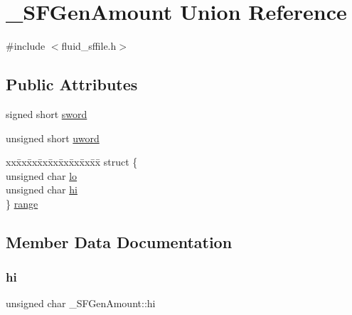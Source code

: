 \hypertarget{union__SFGenAmount}{}\section{\+\_\+\+S\+F\+Gen\+Amount Union Reference}
\label{union__SFGenAmount}


{\ttfamily \#include $<$fluid\+\_\+sffile.\+h$>$}

\subsection*{Public Attributes}
\begin{DoxyCompactItemize}
\item 
signed short \hyperlink{union__SFGenAmount_a0ec8e03ee604c20f645b9c13b6372ffe}{sword}
\item 
unsigned short \hyperlink{union__SFGenAmount_a07f5584e6af8e7a5e50a07fcc54d7e06}{uword}
\item 
\begin{tabbing}
xx\=xx\=xx\=xx\=xx\=xx\=xx\=xx\=xx\=\kill
struct \{\\
\>unsigned char \hyperlink{union__SFGenAmount_a148ae8443e13aec965011f35f98bb8cd}{lo}\\
\>unsigned char \hyperlink{union__SFGenAmount_a2a4866981dd29e7a7261ef2408d22c3b}{hi}\\
\} \hyperlink{union__SFGenAmount_ac7aa41e4e3bc575e4b18f76382df1171}{range}\\

\end{tabbing}\end{DoxyCompactItemize}


\subsection{Member Data Documentation}
\mbox{\label{union__SFGenAmount_a2a4866981dd29e7a7261ef2408d22c3b}} 
\subsubsection{\texorpdfstring{hi}{hi}}
{\footnotesize\ttfamily unsigned char \+\_\+\+S\+F\+Gen\+Amount\+::hi}

\mbox{\label{union__SFGenAmount_a148ae8443e13aec965011f35f98bb8cd}} 
